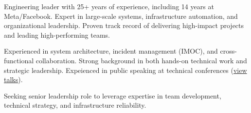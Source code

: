 
\begin{cvparagraph}

    Engineering leader with 25+ years of experience, including 14 years at Meta/Facebook.
    Expert in large-scale systems, infrastructure automation, and organizational leadership.
    Proven track record of delivering high-impact projects and leading high-performing teams.

    Experienced in system architecture, incident management (IMOC), and cross-functional
    collaboration. Strong background in both hands-on technical work and strategic leadership.
    Expeienced in public speaking at technical conferences (\href{https://www.angelofailla.com/public_talks/}{view talks}).

    Seeking senior leadership role to leverage expertise in team development, technical strategy,
    and infrastructure reliability.
\end{cvparagraph}